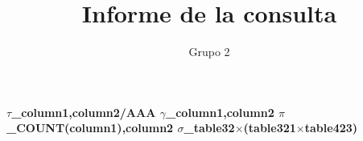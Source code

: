 \documentclass{article}
\begin{document}
\title{Informe de la consulta}
\author{Grupo 2}
\maketitle
\textbf{\huge{$\tau$_{column1,column2/AAA}
\newline$\gamma$_{column1,column2}
\newline$\pi$_{COUNT(column1),column2}
\newline$\sigma$_{table32$\times$(table321$\times$table423)}
}
}
\end{document}
